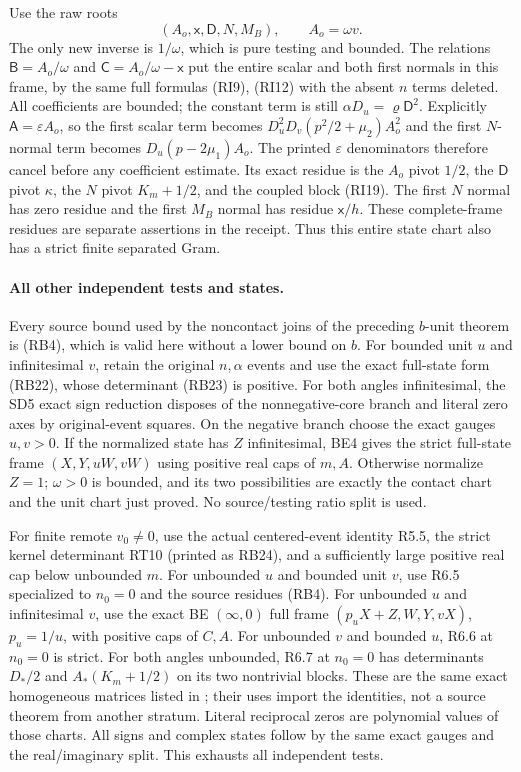 Use the raw roots
\[
 (A_o,\mathsf x,\mathsf D,N,M_B),\qquad A_o=\omega v.
\]
The only new inverse is $1/\omega$, which is pure testing and
bounded. The relations $\mathsf B=A_o/\omega$ and
$\mathsf C=A_o/\omega-\mathsf x$ put the entire scalar and both
first normals in this frame, by the same full formulas (RI9),
(RI12) with the absent $n$ terms deleted. All coefficients are
bounded; the constant term is still $\alpha D_u=\varrho\mathsf D^2$.
Explicitly $\mathsf A=\varepsilon A_o$, so the first scalar term
becomes $D_u^2D_v(p^2/2+\mu_2)A_o^2$ and the first $N$-normal
term becomes $D_u(p-2\mu_1)A_o$. The printed $\varepsilon$
denominators therefore cancel before any coefficient estimate.
Its exact residue is the $A_o$ pivot $1/2$, the $\mathsf D$ pivot
$\kappa$, the $N$ pivot $K_m+1/2$, and the coupled block (RI19).
The first $N$ normal has zero residue and the first $M_B$ normal
has residue $\mathsf x/h$. These complete-frame residues are
separate assertions in the receipt. Thus this entire state chart
also has a strict finite separated Gram.

\paragraph{All other independent tests and states.}
Every source bound used by the noncontact joins of the preceding
$b$-unit theorem is (RB4), which is valid here without a lower bound
on $b$. For bounded unit $u$ and infinitesimal $v$, retain the original
$n,\alpha$ events and use the exact full-state form (RB22), whose
determinant (RB23) is positive. For both angles infinitesimal, the
SD5 exact sign reduction disposes of the nonnegative-core branch
and literal zero axes by original-event squares. On the negative
branch choose the exact gauges $u,v>0$. If the normalized state has
$Z$ infinitesimal, BE4 gives the strict full-state frame
$(X,Y,uW,vW)$ using positive real caps of $m,A$.
Otherwise normalize $Z=1$; $\omega>0$ is bounded, and its two
possibilities are exactly the contact chart and the unit chart just
proved. No source/testing ratio split is used.

For finite remote $v_0\ne0$, use the actual centered-event identity
R5.5, the strict kernel determinant RT10 (printed as RB24), and a
sufficiently large positive real cap below unbounded $m$.
For unbounded $u$ and bounded unit $v$, use R6.5 specialized to
$n_0=0$ and the source residues (RB4). For unbounded $u$ and
infinitesimal $v$, use the exact BE $(\infty,0)$ full frame
$(p_uX+Z,W,Y,vX)$, $p_u=1/u$, with positive caps of $C,A$.
For unbounded $v$ and bounded $u$, R6.6 at $n_0=0$ is strict.
For both angles unbounded, R6.7 at $n_0=0$ has determinants
$D_*/2$ and $A_*(K_m+1/2)$ on its two nontrivial blocks.
These are the same exact homogeneous matrices listed in
; their uses import the
identities, not a source theorem from another stratum.
Literal reciprocal zeros are polynomial values of those charts.
All signs and complex states follow by the same exact gauges and
the real/imaginary split. This exhausts all independent tests.

